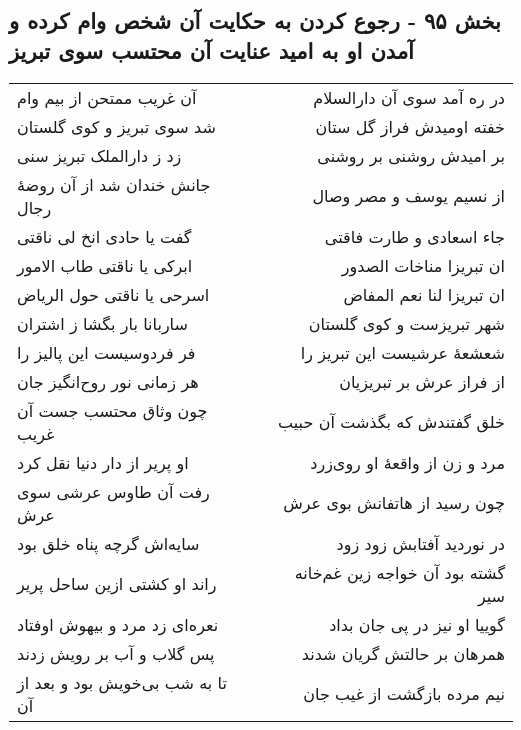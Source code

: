 \begin{center}
\section*{بخش ۹۵ - رجوع کردن به حکایت آن شخص وام کرده و آمدن او به امید عنایت آن محتسب سوی تبریز}
\label{sec:sh095}
\begin{longtable}{l p{0.5cm} r}
آن غریب ممتحن از بیم وام
&&
در ره آمد سوی آن دارالسلام
\\
شد سوی تبریز و کوی گلستان
&&
خفته اومیدش فراز گل ستان
\\
زد ز دارالملک تبریز سنی
&&
بر امیدش روشنی بر روشنی
\\
جانش خندان شد از آن روضهٔ رجال
&&
از نسیم یوسف و مصر وصال
\\
گفت یا حادی انخ لی ناقتی
&&
جاء اسعادی و طارت فاقتی
\\
ابرکی یا ناقتی طاب الامور
&&
ان تبریزا مناخات الصدور
\\
اسرحی یا ناقتی حول الریاض
&&
ان تبریزا لنا نعم المفاض
\\
ساربانا بار بگشا ز اشتران
&&
شهر تبریزست و کوی گلستان
\\
فر فردوسیست این پالیز را
&&
شعشعهٔ عرشیست این تبریز را
\\
هر زمانی نور روح‌انگیز جان
&&
از فراز عرش بر تبریزیان
\\
چون وثاق محتسب جست آن غریب
&&
خلق گفتندش که بگذشت آن حبیب
\\
او پریر از دار دنیا نقل کرد
&&
مرد و زن از واقعهٔ او روی‌زرد
\\
رفت آن طاوس عرشی سوی عرش
&&
چون رسید از هاتفانش بوی عرش
\\
سایه‌اش گرچه پناه خلق بود
&&
در نوردید آفتابش زود زود
\\
راند او کشتی ازین ساحل پریر
&&
گشته بود آن خواجه زین غم‌خانه سیر
\\
نعره‌ای زد مرد و بیهوش اوفتاد
&&
گوییا او نیز در پی جان بداد
\\
پس گلاب و آب بر رویش زدند
&&
همرهان بر حالتش گریان شدند
\\
تا به شب بی‌خویش بود و بعد از آن
&&
نیم مرده بازگشت از غیب جان
\\
\end{longtable}
\end{center}
